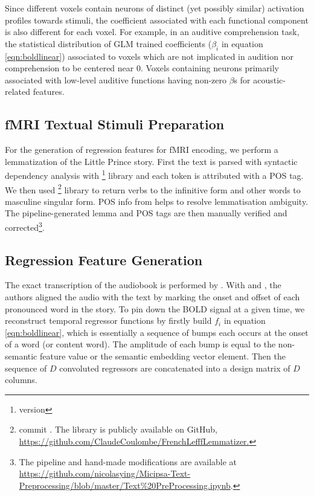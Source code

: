 Since different voxels contain neurons of distinct (yet possibly similar) activation profiles towards stimuli, the coefficient associated with each functional component is also different for each voxel. For example, in an auditive comprehension task, the statistical distribution of GLM trained coefficients (\(\beta_{i}\) in equation \ref{eqn:boldlinear}) associated to voxels which are not implicated in audition nor comprehension to be centered near 0. Voxels containing neurons primarily associated with low-level auditive functions having non-zero \(\beta\)s for acoustic-related features.

\subsection{fMRI Textual Stimuli Preparation} 

For the generation of regression features for fMRI encoding, we perform a lemmatization of the Little Prince story. First the text is parsed with syntactic dependency analysis with \footnote{version } library and each token is attributed with a POS tag. We then used \footnote{commit . The library is publicly available on GitHub, \url{https://github.com/ClaudeCoulombe/FrenchLefffLemmatizer.}}\parencite{sagotLefffFreelyAvailable2010} library to return verbs to the infinitive form and other words to masculine singular form. POS info from  helps to resolve lemmatisation ambiguity. The pipeline-generated lemma and POS tags are then manually verified and corrected\footnote{The pipeline and hand-made modifications are available at \url{https://github.com/nicolasying/Micipsa-Text-Preprocessing/blob/master/Text\%20PreProcessing.ipynb}.}.

\subsection{Regression Feature Generation}
\label{subsec:regressionfeaturegeneration}
The exact transcription of the audiobook is performed by \textcite{todorovicAnalysesIRMfLors2018}. With  and , the authors aligned the audio with the text by marking the onset and offset of each pronounced word in the story. To pin down the BOLD signal at a given time, we reconstruct temporal regressor functions by firstly build \(f_{i}\) in equation \ref{eqn:boldlinear}, which is essentially a sequence of bumps each occurs at the onset of a word (or content word). The amplitude of each bump is equal to the non-semantic feature value or the semantic embedding vector element. Then the sequence of \(D\) convoluted  regressors are concatenated into a design matrix of \(D\) columns.

